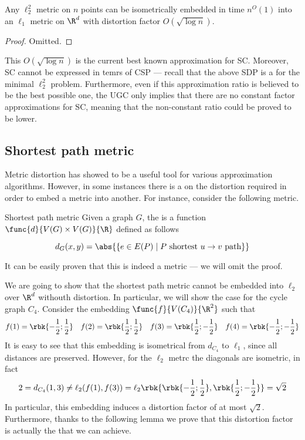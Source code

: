 \documentclass[a4paper, 12pt]{report}
\begin{document}
    \begin{framedprop}{}
        Any $\ell_2^2$ metric on $n$ points can be isometrically embedded in time $n^O(1)$ into an $\ell_1$ metric on $\R^d$ with distortion factor $O(\sqrt{\log n})$.
    \end{framedprop}

    \begin{proof}
        Omitted.
    \end{proof}

    This $O(\sqrt{\log n})$ is the current best known approximation for SC. Moreover, SC cannot be expressed in temrs of CSP --- recall that the above SDP is a  for the minimal $\ell_2^2$ problem. Furthermore, even if this approximation ratio is believed to be the best possible one, the UGC only implies that there are no constant factor approximations for SC, meaning that the non-constant ratio could be proved to be lower.

    \subsection{Shortest path metric}

    Metric distortion has showed to be a useful tool for various approximation algorithms. However, in some instances there is a  on the distortion required in order to embed a metric into another. For instance, consider the following metric.

    \begin{frameddefn}{Shortest path metric}
        Given a graph $G$, the  is a function $\func{d}{V(G) \times V(G)}{\R}$ defined as follows

        $$d_G(x, y) = \abs{\{e \in E(P) \mid P \ \mathrm{shortest} \ u \to v \ \mathrm{path}\}}$$
    \end{frameddefn}

    It can be easily proven that this is indeed a metric --- we will omit the proof.

    We are going to show that the shortest path metric cannot be embedded into $\ell_2$ over $\R^d$ withouth distortion. In particular, we will show the case for the cycle graph $C_4$. Consider the embedding $\func{f}{V(C_4)}{\R^2}$ such that $$f(1) = \rbk{-\dfrac{1}{2}; \dfrac{1}{2}} \quad f(2) = \rbk{\dfrac{1}{2}; \dfrac{1}{2}} \quad f(3) =\rbk{\dfrac{1}{2}; -\dfrac{1}{2}} \quad f(4) = \rbk{-\dfrac{1}{2}; -\dfrac{1}{2}}$$ It is easy to see that this embedding is isometrical from $d_{C_4}$ to $\ell_1$, since all distances are preserved. However, for the $\ell_2$ metrc the diagonals are  isometric, in fact $$2 = d_{C_4}(1, 3) \neq \ell_2(f(1), f(3)) = \ell_2 \rbk{\rbk{-\dfrac{1}{2}; \dfrac{1}{2}},\rbk{\dfrac{1}{2}; -\dfrac{1}{2}}} = \sqrt 2$$ In particular, this embedding induces a distortion factor of at most $\sqrt 2$. Furthermore, thanks to the following lemma we prove that this distortion factor is actually the  that we can achieve.
\end{document}
